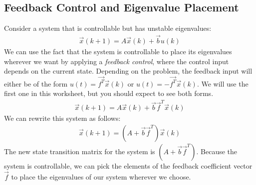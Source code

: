 \subsection*{Feedback Control and Eigenvalue Placement}
Consider a system that is controllable but has unstable eigenvalues:
\begin{align*}
    \vec{x}(k + 1) = A\vec{x}(k) + \vec{b}u(k)
\end{align*}
We can use the fact that the system is controllable to place its eigenvalues wherever we want by applying a \textit{feedback control}, where the control input depends on the current state. Depending on the problem, the feedback input will either be of the form $u(t) = \vec{f^T} \vec{x}(k)$ or $u(t) = -\vec{f^T} \vec{x}(k)$. We will use the first one in this worksheet, but you should expect to see both forms.
\begin{align*}
    \vec{x}(k + 1) = A\vec{x}(k) + \vec{b}\vec{f}^T \vec{x}(k)
\end{align*}
We can rewrite this system as follows:
\begin{align*}
    \vec{x}(k + 1) = (A + \vec{b}\vec{f}^T) \vec{x}(k)
\end{align*}
The new state transition matrix for the system is $(A + \vec{b}\vec{f}^T)$. Because the system is controllable, we can pick the elements of the feedback coefficient vector $\vec{f}$ to place the eigenvalues of our system wherever we choose. \\
\newline

